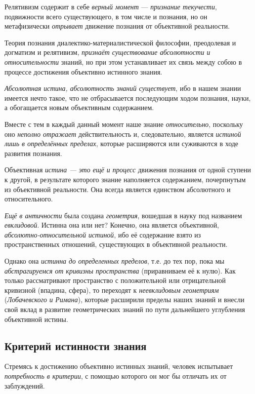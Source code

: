\documentclass[a4paper,14pt,russian]{extreport}
\begin{document}
Релятивизм содержит в себе \emph{верный момент} --- \emph{признание текучести}, подвижности всего существующего, в том числе и познания, но он метафизически \emph{отрывает} движение познания от объективной реальности.

Теория познания диалектико-материалистической философии, преодолевая и догматизм и релятивизм, \emph{признаёт существование абсолютности и относительности} знаний, но при этом устанавливает их связь между собою в процессе достижения объективно истинного знания.

\emph{Абсолютная истина, абсолютность знаний существует}, ибо в нашем знании имеется нечто такое, что не отбрасывается последующим ходом познания, науки, а обогащается новым объективным содержанием.

Вместе с тем в каждый данный момент наше знание \emph{относительно}, поскольку оно \emph{неполно отражает} действительность и, следовательно, является \emph{истиной лишь в определённых пределах}, которые расширяются или суживаются в ходе развития познания.

Объективная \emph{истина --- это ещё и процесс} движения познания от одной ступени к другой, в результате которого знание наполняется содержанием, почерпнутым из объективной реальности. Она всегда является единством абсолютного и относительного.

\emph{Ещё в античности} была создана \emph{геометрия}, вошедшая в науку под названием \emph{евклидовой}. Истинна она или нет? Конечно, она является объективной, \emph{абсолютно-относительной истиной}, ибо её содержание взято из пространственных отношений, существующих в объективной реальности.

Однако она \emph{истинна до определенных пределов}, т.е. до тех пор, пока мы \emph{абстрагируемся от кривизны пространства} (приравниваем её к нулю). Как только рассматривают пространство с положительной или отрицательной кривизной (впадина, сфера), то переходят к \emph{неевклидовым геометриям} (\emph{Лобачевского и Римана}), которые расширили пределы наших знаний и внесли свой вклад в развитие геометрических знаний по пути дальнейшего углубления объективной истины.

\subsection{Критерий истинности знания}

Стремясь к достижению объективно истинных знаний, человек испытывает \emph{потребность в критерии}, с помощью которого он мог бы отличать их от заблуждений.
\end{document}
